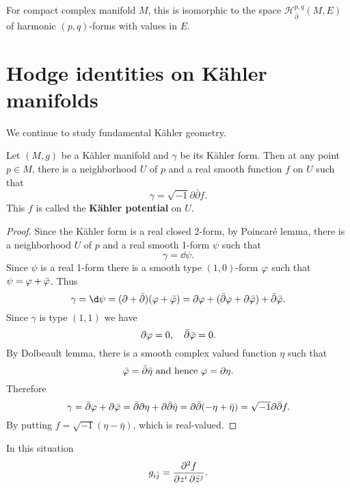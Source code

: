 \documentclass[12pt]{article}
\begin{document}
For compact complex manifold \(M\), this is isomorphic to the space \(\mathcal{H}^{p,q}
_{\bar{\partial}}(M,E)\) of harmonic \((p,q)\)-forms with values in \(E\).

\section{Hodge identities on K\"ahler manifolds}

We continue to study fundamental K\"ahler geometry.
\begin{prop}
  Let \((M,g)\) be a K\"ahler manifold and \(\gamma\) be its K\"ahler form. Then at
  any point \(p\in M\), there is a neighborhood \(U\) of \(p\) and a real smooth
  function \(f\) on \(U\) such that \[
    \gamma=\sqrt{-1}\partial\bar{\partial}f
  .\] This \(f\) is called the \textbf{K\"ahler potential} on \(U\).
\end{prop}
\begin{proof}
  Since the K\"ahler form is a real closed 2-form, by Poincaré lemma, there is a
  neighborhood \(U\) of \(p\) and a real smooth 1-form \(\psi\) such that \[
    \gamma=\dd{\psi}
  .\] Since \(\psi\) is a real 1-form there is a smooth type \((1,0)\)-form \(\varphi\)
  such that \(\psi=\varphi+\bar{\varphi}\). Thus \[
    \gamma=\dd{\psi}=(\partial +\bar{\partial})(\vphi+\bar{\vphi})=
    \partial\vphi+(\bar{\partial}\vphi+\partial\bar{\vphi})+\bar{\partial}\bar{\vphi}
  .\] Since \(\gamma\) is type \((1,1)\) we have \[
    \partial\varphi=0,\quad\bar{\partial}\bar{\varphi}=0
  .\] By Dolbeault lemma, there is a smooth complex valued function \(\eta\)
  such that \[
    \bar{\varphi}=\bar{\partial}\bar{\eta}\text{ and hence }\varphi=\partial\eta
  .\] Therefore \[
    \gamma=\bar{\partial}\varphi+\partial\bar{\varphi}=\bar{\partial}\partial\eta
    +\partial\bar{\partial}\bar{\eta}=\partial\bar{\partial}(-\eta+\bar{\eta})
    =\sqrt{-1}\partial\bar{\partial}f
  .\] By putting \(f=\sqrt{-1}(\eta-\bar{\eta})\), which is real-valued.
\end{proof}
\begin{remark}
  In this situation \[
    g_{i\bar{j}}=\pdv{f}{z^i,\bar{z}^j}
  .\]
\end{remark}
\end{document}
